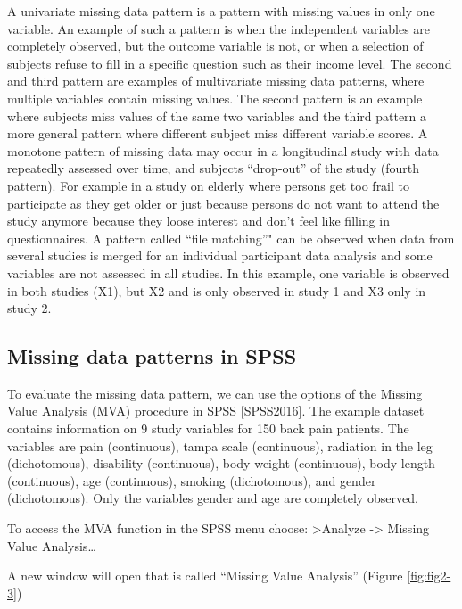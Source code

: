 \documentclass[]{book}
\begin{document}
A univariate missing data pattern is a pattern with missing values in
only one variable. An example of such a pattern is when the independent
variables are completely observed, but the outcome variable is not, or
when a selection of subjects refuse to fill in a specific question such
as their income level. The second and third pattern are examples of
multivariate missing data patterns, where multiple variables contain
missing values. The second pattern is an example where subjects miss
values of the same two variables and the third pattern a more general
pattern where different subject miss different variable scores. A
monotone pattern of missing data may occur in a longitudinal study with
data repeatedly assessed over time, and subjects ``drop-out'' of the
study (fourth pattern). For example in a study on elderly where persons
get too frail to participate as they get older or just because persons
do not want to attend the study anymore because they loose interest and
don't feel like filling in questionnaires. A pattern called ``file
matching''" can be observed when data from several studies is merged for
an individual participant data analysis and some variables are not
assessed in all studies. In this example, one variable is observed in
both studies (X1), but X2 and is only observed in study 1 and X3 only in
study 2.

\subsection{Missing data patterns in
SPSS}\label{missing-data-patterns-in-spss}

To evaluate the missing data pattern, we can use the options of the
Missing Value Analysis (MVA) procedure in SPSS {[}SPSS2016{]}. The
example dataset contains information on 9 study variables for 150 back
pain patients. The variables are pain (continuous), tampa scale
(continuous), radiation in the leg (dichotomous), disability
(continuous), body weight (continuous), body length (continuous), age
(continuous), smoking (dichotomous), and gender (dichotomous). Only the
variables gender and age are completely observed.

To access the MVA function in the SPSS menu choose:
\textgreater{}Analyze -\textgreater{} Missing Value Analysis\ldots{}

A new window will open that is called ``Missing Value Analysis'' (Figure
\ref{fig:fig2-3})
\end{document}
